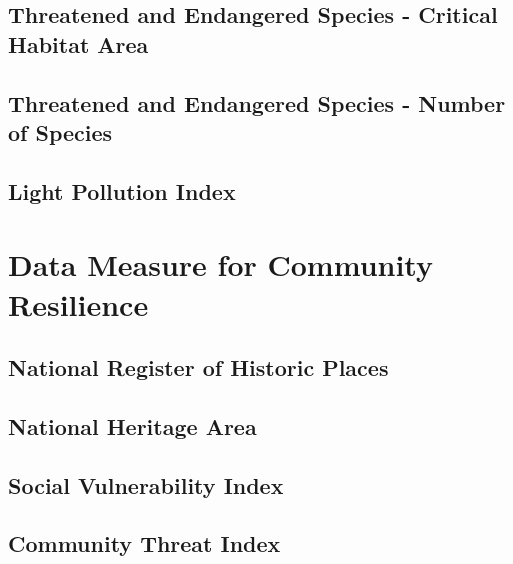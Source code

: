 \documentclass[]{book}
\begin{document}
\hypertarget{threatened-and-endangered-species---critical-habitat-area}{%
\section{Threatened and Endangered Species - Critical Habitat Area}\label{threatened-and-endangered-species---critical-habitat-area}}

\hypertarget{threatened-and-endangered-species---number-of-species}{%
\section{Threatened and Endangered Species - Number of Species}\label{threatened-and-endangered-species---number-of-species}}

\hypertarget{light-pollution-index}{%
\section{Light Pollution Index}\label{light-pollution-index}}

\hypertarget{cl}{%
\chapter{Data Measure for Community Resilience}\label{cl}}

\hypertarget{national-register-of-historic-places}{%
\section{National Register of Historic Places}\label{national-register-of-historic-places}}

\hypertarget{national-heritage-area}{%
\section{National Heritage Area}\label{national-heritage-area}}

\hypertarget{social-vulnerability-index}{%
\section{Social Vulnerability Index}\label{social-vulnerability-index}}

\hypertarget{community-threat-index}{%
\section{Community Threat Index}\label{community-threat-index}}
\end{document}
